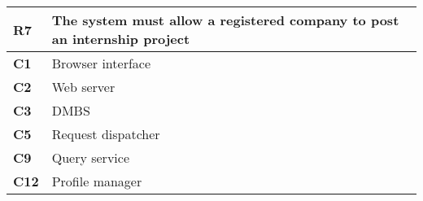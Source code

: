 \begin{table}[H]
    \centering
    \begin{tabular}{|l|m{10cm}|}
        \hline \textbf{R7} & The system must allow a registered company to post an internship project \\
        \hline \textbf{C1} & Browser interface \\
        \hline \textbf{C2} & Web server \\
        \hline \textbf{C3} & DMBS \\
        \hline \textbf{C5} & Request dispatcher \\
        \hline \textbf{C9} & Query service \\
        \hline \textbf{C12} & Profile manager \\
        \hline
    \end{tabular}
\end{table}

